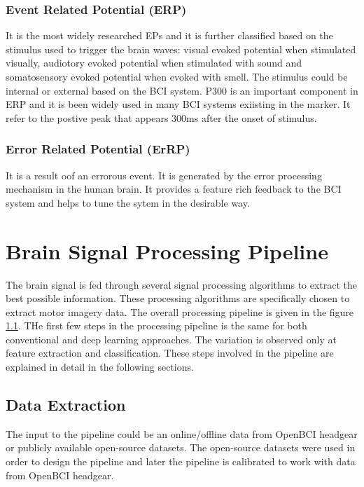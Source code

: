    \subsubsection{Event Related Potential (ERP)}
It is the most widely researched EPs and it is further classified based on the stimulus used to trigger the brain waves: visual evoked potential when stimulated visually,
audiotory evoked potential when stimulated with sound and somatosensory evoked potential when evoked with smell. The stimulus could be internal or external based on the BCI 
system. P300 is an important component in ERP and it is been widely used in many BCI systems exiisting in the marker. It refer to the postive peak that appears 300ms after the 
onset of stimulus.

    \subsubsection{Error Related Potential (ErRP)}
It is a result oof an errorous event. It is generated by the error processing mechanism in the human brain. It provides a feature rich feedback to the BCI system and helps to
tune the sytem in the desirable way.

\section{Brain Signal Processing Pipeline}
The brain signal is fed through several signal processing algorithms to extract the best possible information. These processing algorithms are specifically chosen to  extract
motor imagery data. The overall processing pipeline is given in the figure \ref{}. THe first few steps in the processing pipeline is the same for both conventional and deep learning
approaches.  The variation is observed only at feature extraction and classification. These steps involved in the pipeline are explained in detail in the following sections.

\subsection{Data Extraction}
The input to the pipeline could be an online/offline data from OpenBCI headgear or publicly available open-source datasets. The open-source datasets were used in order to design the
pipeline and later the pipeline is calibrated to work with data from OpenBCI headgear.

